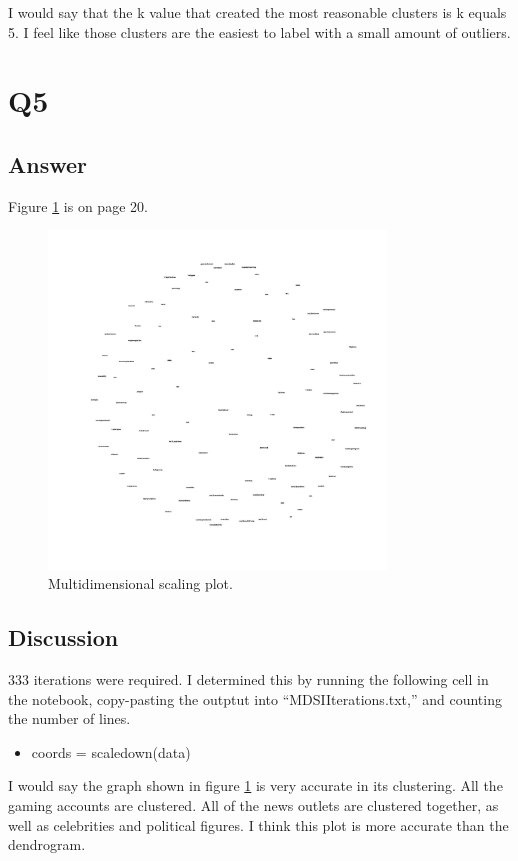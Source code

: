 \documentclass[12pt]{article}
\begin{document}
I would say that the k value that created the most reasonable clusters is k equals 5.  I feel like those clusters are the easiest to label with a small amount of outliers.

\section*{Q5}

\subsection*{Answer}

Figure \ref{fig:mds} is on page 20.

\begin{figure}[h]
    \centering
    \includegraphics[trim=0 0 0 0, clip, width=0.8\textwidth] {blogs2d.jpg}
    \caption{Multidimensional scaling plot.}
    \label{fig:mds}
\end{figure}

\subsection*{Discussion}
333 iterations were required.  I determined this by running the following cell in the notebook, copy-pasting the outptut into ``MDSIIterations.txt,'' and counting the number of lines.
\begin{itemize}
    \item coords = scaledown(data)
\end{itemize}
I would say the graph shown in figure \ref{fig:mds} is very accurate in its clustering. All the gaming accounts are clustered.  All of the news outlets are clustered together, as well as celebrities and political figures.  I think this plot is more accurate than the dendrogram.
\end{document}
